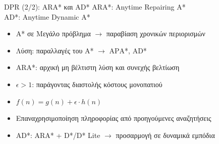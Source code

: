 \documentclass[10pt, compress, handout]{beamer} %
\begin{document}
\begin{frame}{DPR (2/2): ARA* και AD*}
	ARA*: Anytime Repairing A*\\
	AD*: Anytime Dynamic A*
	
	\begin{itemize}
		\item A* σε Μεγάλο πρόβλημα $\rightarrow$ παραβίαση χρονικών περιορισμών
		\item Λύση: παραλλαγές του A* $\rightarrow$ ΑΡΑ*, AD*
		\item ARA*: αρχική μη βέλτιστη λύση και συνεχής βελτίωση
		\item $\epsilon>1$: παράγοντας διαστολής κόστους μονοπατιού
		\item $f(n) = g(n) + \epsilon \cdot h(n)$
		\item Επαναχρησιμοποίηση πληροφορίας από προηγούμενες αναζητήσεις
		\item AD*: ARA* + D*/D* Lite $\rightarrow$ προσαρμογή σε δυναμικά εμπόδια
	\end{itemize}
	\begin{figure}
		\captionsetup[subfigure]{labelformat=empty}
		\hspace{0.5cm}
	\end{figure}
\end{frame}
\end{document}
